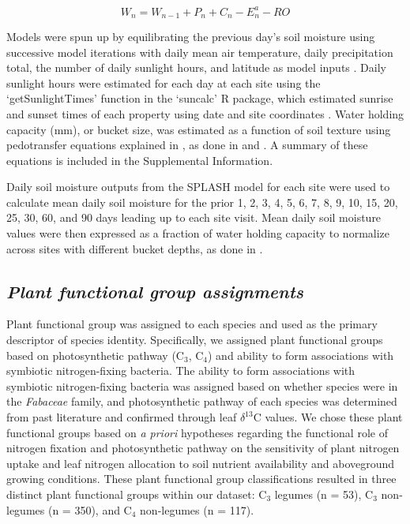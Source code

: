 \begin{equation}
    \label{eq_4.7}
    W_n = W_{n-1} + P_n + C_n - E_{n}^{a} - RO
\end{equation}

Models were spun up by equilibrating the previous day’s soil moisture using successive model iterations with daily mean air temperature, daily precipitation total, the number of daily sunlight hours, and latitude as model inputs . Daily sunlight hours were estimated for each day at each site using the ‘getSunlightTimes’ function in the ‘suncalc’ R package, which estimated sunrise and sunset times of each property using date and site coordinates . Water holding capacity (mm), or bucket size, was estimated as a function of soil texture using pedotransfer equations explained in , as done in  and . A summary of these equations is included in the Supplemental Information.

Daily soil moisture outputs from the SPLASH model for each site were used to calculate mean daily soil moisture for the prior 1, 2, 3, 4, 5, 6, 7, 8, 9, 10, 15, 20, 25, 30, 60, and 90 days leading up to each site visit. Mean daily soil moisture values were then expressed as a fraction of water holding capacity to normalize across sites with different bucket depths, as done in .

\subsection{\textit{Plant functional group assignments}}
Plant functional group was assigned to each species and used as the primary descriptor of species identity. Specifically, we assigned plant functional groups based on photosynthetic pathway (C$_3$, C$_4$) and ability to form associations with symbiotic nitrogen-fixing bacteria. The ability to form associations with symbiotic nitrogen-fixing bacteria was assigned based on whether species were in the \textit{Fabaceae} family, and photosynthetic pathway of each species was determined from past literature and confirmed through leaf $\delta^{13}$C values. We chose these plant functional groups based on \textit{a priori} hypotheses regarding the functional role of nitrogen fixation and photosynthetic pathway on the sensitivity of plant nitrogen uptake and leaf nitrogen allocation to soil nutrient availability and aboveground growing conditions. These plant functional group classifications resulted in three distinct plant functional groups within our dataset: C$_3$ legumes (n = 53), C$_3$ non-legumes (n = 350), and C$_4$ non-legumes (n = 117).

